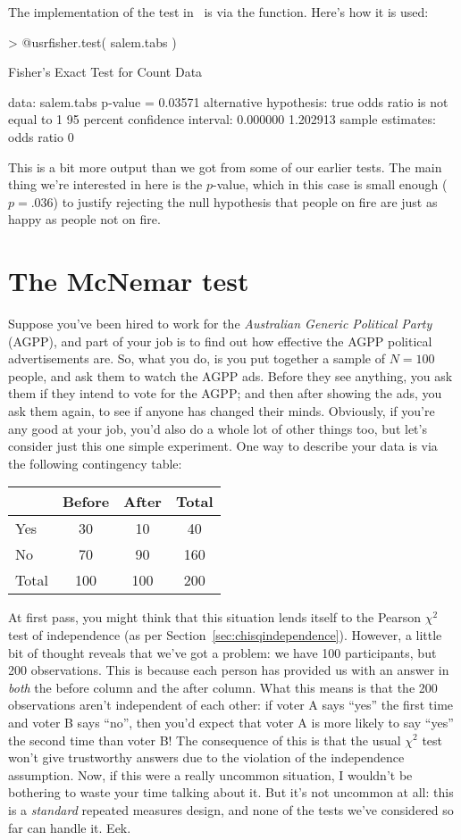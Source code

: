 The implementation of the test in \R\ is via the  function. Here's how it is used:
\begin{rblock1}
> @usr{fisher.test( salem.tabs )}

	Fisher's Exact Test for Count Data

data:  salem.tabs 
p-value = 0.03571
alternative hypothesis: true odds ratio is not equal to 1 
95 percent confidence interval:
 0.000000 1.202913 
sample estimates:
odds ratio 
         0 
\end{rblock1}
This is a bit more output than we got from some of our earlier tests. The main thing we're interested in here is the $p$-value, which in this case is small enough ($p=.036$) to justify rejecting the null hypothesis that people on fire are just as happy as people not on fire. 


\section{The McNemar test\label{sec:mcnemar}}

Suppose you've been hired to work for the {\it Australian Generic Political Party} (AGPP), and part of your job is to find out how effective the AGPP political advertisements are. So, what you do, is you put together a sample of $N=100$ people, and ask them to watch the AGPP ads. Before they see anything, you ask them if they intend to vote for the AGPP; and then after showing the ads, you ask them again, to see if anyone has changed their minds. Obviously, if you're any good at your job, you'd also do a whole lot of other things too, but let's consider just this one simple experiment. One way to describe your data is via the following contingency table:

\begin{center}
\begin{tabular}{l|cc|c}
& Before & After & Total \\ \hline
Yes   & 30 & 10 & 40 \\
No    & 70 & 90 & 160 \\ \hline
Total & 100 & 100 & 200
\end{tabular}
\end{center}

\noindent
At first pass, you might think that this situation lends itself to the Pearson $\chi^2$ test of independence (as per Section~\ref{sec:chisqindependence}). However, a little bit of thought reveals that we've got a problem: we have 100 participants, but 200 observations. This is because each person has provided us with an answer in {\it both} the before column and the after column. What this means is that the 200 observations aren't independent of each other: if voter A says ``yes'' the first time and voter B says ``no'', then you'd expect that voter A is more likely to say ``yes'' the second time than voter B! The consequence of this is that the usual $\chi^2$ test won't give trustworthy answers due to the violation of the independence assumption. Now, if this were a really uncommon situation, I wouldn't be bothering to waste your time talking about it. But it's not uncommon at all: this is a {\it standard} repeated measures design, and none of the tests we've considered so far can handle it. Eek. 

